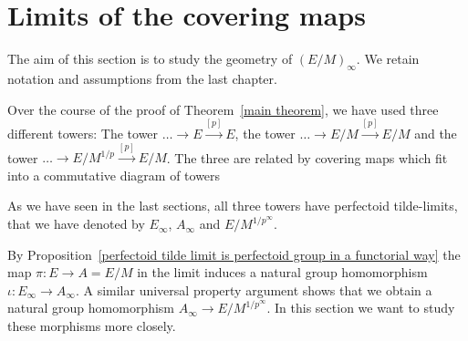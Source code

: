 \documentclass[10pt,oneside]{amsart}
\theoremstyle{definition}
\begin{document}
	
	\section{Limits of the covering maps}
	The aim of this section is to study the geometry of $(E/M)_\infty$. We retain notation and assumptions from the last chapter.
	
	Over the course of the proof of Theorem~\ref{main theorem}, we have used three different towers: The tower $\dots \rightarrow E\xrightarrow{[p]} E$, the tower $\dots \rightarrow E/M \xrightarrow{[p]} E/M$ and the tower $\dots \rightarrow E/M^{1/p} \xrightarrow{[p]} E/M$. The three are related by covering maps which fit into a commutative diagram of towers
	\begin{center}
	\end{center}
	As we have seen in the last sections, all three towers have perfectoid tilde-limits, that we have denoted by $E_\infty$, $A_\infty$ and $E/M^{1/p^\infty}$.
	
	By Proposition~\ref{perfectoid tilde limit is perfectoid group in a functorial way} the map $\pi:E\rightarrow A=E/M$ in the limit induces a natural group homomorphism $\iota:E_\infty \rightarrow A_\infty$. A similar universal property argument shows that we obtain a natural group homomorphism $A_\infty \rightarrow E/M^{1/p^\infty}$. In this section we want to study these morphisms more closely.
	
\end{document}
